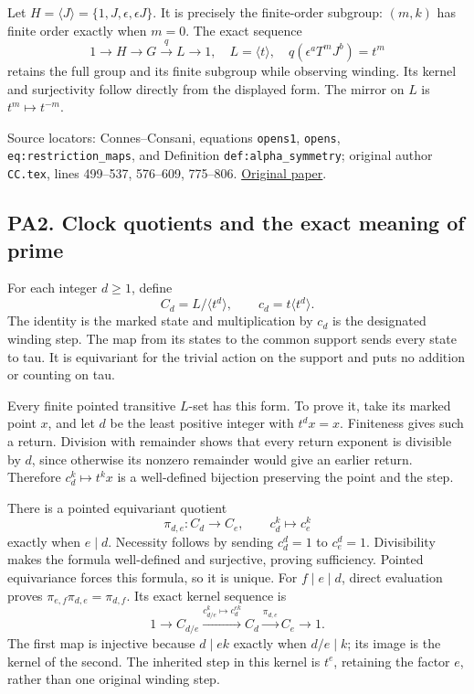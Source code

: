 Let \(H=\langle J\rangle=\{1,J,\epsilon,\epsilon J\}\). It is precisely the finite-order subgroup: \((m,k)\) has finite order exactly when \(m=0\). The exact sequence \[
1\longrightarrow H\longrightarrow G\xrightarrow{q}L\longrightarrow1,
\quad L=\langle t\rangle,\quad q(\epsilon^aT^mJ^b)=t^m
\] retains the full group and its finite subgroup while observing winding. Its kernel and surjectivity follow directly from the displayed form. The mirror on \(L\) is \(t^m\mapsto t^{-m}\).

Source locators: Connes--Consani, equations \texttt{opens1}, \texttt{opens}, \texttt{eq:restriction\_maps}, and Definition \texttt{def:alpha\_symmetry}; original author \nolinkurl{CC.tex}, lines 499--537, 576--609, 775--806. \href{https://arxiv.org/html/2609.00299v1}{Original paper}.

\subsection{PA2. Clock quotients and the exact meaning of prime}\label{pa20260924-pa2.-clock-quotients-and-the-exact-meaning-of-prime}

For each integer \(d\ge1\), define \[
C_d=L/\langle t^d\rangle,\qquad c_d=t\langle t^d\rangle.
\] The identity is the marked state and multiplication by \(c_d\) is the designated winding step. The map from its states to the common support sends every state to tau. It is equivariant for the trivial action on the support and puts no addition or counting on tau.

Every finite pointed transitive \(L\)-set has this form. To prove it, take its marked point \(x\), and let \(d\) be the least positive integer with \(t^dx=x\). Finiteness gives such a return. Division with remainder shows that every return exponent is divisible by \(d\), since otherwise its nonzero remainder would give an earlier return. Therefore \(c_d^k\mapsto t^kx\) is a well-defined bijection preserving the point and the step.

There is a pointed equivariant quotient \[
\pi_{d,e}:C_d\longrightarrow C_e,\qquad c_d^k\longmapsto c_e^k
\] exactly when \(e\mid d\). Necessity follows by sending \(c_d^d=1\) to \(c_e^d=1\). Divisibility makes the formula well-defined and surjective, proving sufficiency. Pointed equivariance forces this formula, so it is unique. For \(f\mid e\mid d\), direct evaluation proves \(\pi_{e,f}\pi_{d,e}=\pi_{d,f}\). Its exact kernel sequence is \[
1\longrightarrow C_{d/e}\xrightarrow{c_{d/e}^k\mapsto c_d^{ek}}
C_d\xrightarrow{\pi_{d,e}}C_e\longrightarrow1.
\] The first map is injective because \(d\mid ek\) exactly when \(d/e\mid k\); its image is the kernel of the second. The inherited step in this kernel is \(t^e\), retaining the factor \(e\), rather than one original winding step.

